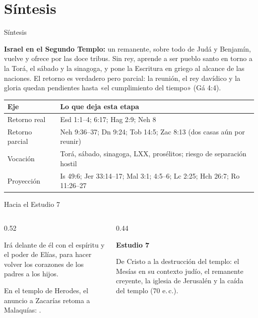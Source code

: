 \section{Síntesis}
\begin{frame}{Síntesis}
\begin{tcolorbox}[colback=piedra,colframe=ladrillo,boxrule=1pt,arc=3pt,fontupper=\small]
\textbf{\textcolor{cafe}{Israel en el Segundo Templo:}} un remanente, sobre todo de Judá y Benjamín, vuelve y ofrece por las doce tribus. Sin rey, aprende a ser pueblo santo en torno a la Torá, el sábado y la sinagoga, y pone la Escritura en griego al alcance de las naciones. El retorno es verdadero pero parcial: la reunión, el rey davídico y la gloria quedan pendientes hasta «el cumplimiento del tiempo» (Gá 4:4).
\end{tcolorbox}
\centering\footnotesize\renewcommand{\arraystretch}{1.25}
\begin{tabular}{>{\RaggedRight\arraybackslash}p{2.4cm}>{\RaggedRight\arraybackslash}p{9.3cm}}
\toprule
\color{ladrillo}\bfseries Eje & \color{ladrillo}\bfseries Lo que deja esta etapa\\\midrule
Retorno real & Esd 1:1--4; 6:17; Hag 2:9; Neh 8\\
Retorno parcial & Neh 9:36--37; Dn 9:24; Tob 14:5; Zac 8:13 (dos casas aún por reunir)\\
Vocación & Torá, sábado, sinagoga, LXX, prosélitos; riesgo de separación hostil\\
Proyección & Is 49:6; Jer 33:14--17; Mal 3:1; 4:5--6; Lc 2:25; Hch 26:7; Ro 11:26--27\\
\bottomrule
\end{tabular}
\elabpropia
\end{frame}

\begin{frame}{Hacia el Estudio 7}
\begin{columns}[c,onlytextwidth]
\begin{column}{0.52\textwidth}
\begin{cita}Irá delante de él con el espíritu y el poder de Elías, para hacer volver los corazones de los padres a los hijos.\end{cita}
\small En el templo de Herodes, el anuncio a Zacarías retoma a Malaquías: .
\end{column}
\begin{column}{0.44\textwidth}
\begin{tcolorbox}[colback=cafe,colframe=cafeosc,coltext=piedra,boxrule=0.8pt,arc=3pt,fontupper=\small]
\textbf{Estudio 7}\par\smallskip
De Cristo a la destrucción del templo: el Mesías en su contexto judío, el remanente creyente, la iglesia de Jerusalén y la caída del templo (70 e.\,c.).
\end{tcolorbox}
\end{column}
\end{columns}
\end{frame}

